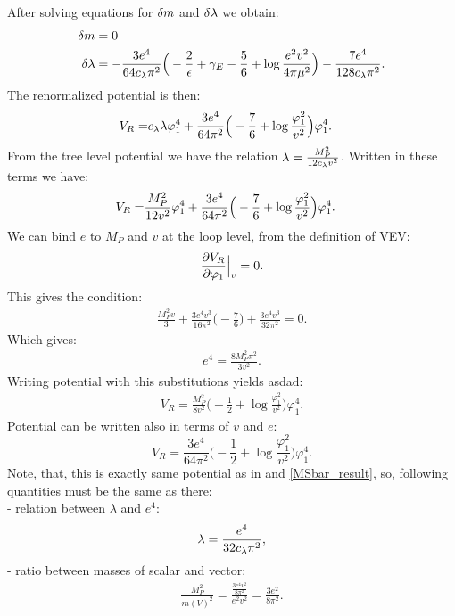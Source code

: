 After solving equations for $\delta m$ and $\delta\lambda$ we obtain:
\begin{align}
\delta m &= 0 \\
\delta\lambda &= -\frac{3e^4}{64c_\lambda\pi^2}\Big(-\frac{2}{\epsilon}+\gamma_E-\frac{5}{6}+
\log\frac{e^2v^2}{4\pi\mu^2}\Big)-\frac{7e^4}{128c_\lambda\pi^2}.
\end{align}
The renormalized potential is then:
\begin{align}
V_R = &c_\lambda\lambda\varphi_1^4 +
\frac{3e^4}{64\pi^2}\Big(-\frac{7}{6}+\log\frac{\varphi_1^2}{v^2}\Big)\varphi_1^4.
\end{align}
From the tree level potential we have the relation $\lambda = \frac{M_P^2}{12c_\lambda v^2}$. 
Written in these terms we have:
\begin{align}
V_R = &\frac{M_P^2}{12v^2}\varphi_1^4 +
\frac{3e^4}{64\pi^2}\Big(-\frac{7}{6}+\log\frac{\varphi_1^2}{v^2}\Big)\varphi_1^4.
\end{align}
We can bind $e$ to $M_P$ and $v$ at the loop level, from the definition of VEV:
\begin{align}
\frac{\partial V_R}{\partial \varphi_1} \Big|_v= 0.
\end{align}
This gives the condition:
\begin{align}
\frac{M_P^2v}{3}+\frac{3e^4v^3}{16\pi^2}\Big(-\frac{7}{6}\Big)+\frac{3e^4v^3}{32\pi^2}=0.
\end{align}
Which gives:
\begin{align}
e^4 = \frac{8M_P^2\pi^2}{3v^2}.
\end{align}
Writing potential with this substitutions yields asdad:
\begin{align}
V_R = \frac{M_P^2}{8v^2}\Big(-\frac{1}{2}+\log\frac{\varphi_1^2}{v^2}\Big)\varphi_1^4.
\end{align}
Potential can be written also in terms of $v$ and $e$:
\begin{equation}
V_R=\frac{3e^4}{64\pi^2}\Big(-\frac{1}{2}+\log\frac{\varphi_1^2}{v^2}\Big)\varphi_1^4.
\end{equation}
Note, that, this is exactly same potential as in \cite{Coleman1973} and \ref{MSbar_result}, 
so, following quantities must be the same as there: \\
\hspace*{0.5cm}- relation between $\lambda$ and $e^4$:
\begin{align}
\lambda = \frac{e^4}{32c_\lambda\pi^2},
\end{align}
\hspace*{0.5cm}- ratio between masses of scalar and vector:
\begin{align}
\frac{M_P^2}{m(V)^2} = \frac{\frac{3e^4v^2}{8\pi^2}}{e^2v^2} = \frac{3e^2}{8\pi^2}.
\end{align}



